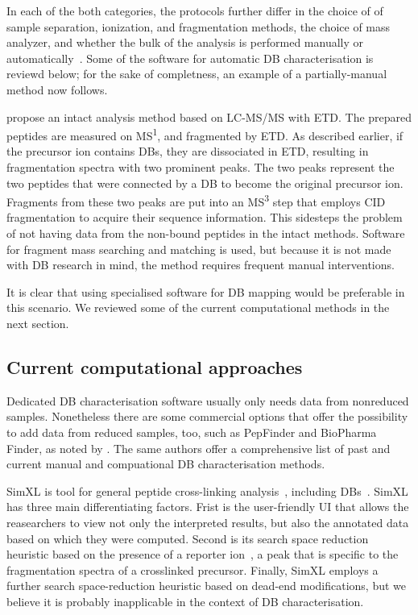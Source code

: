 In each of the both categories, the protocols further differ in the choice of of sample separation, ionization, and fragmentation methods, the choice of mass analyzer, and whether the bulk of the analysis is performed manually or automatically~\cite{lakbub2018recent}. Some of the software for automatic DB characterisation is reviewd below; for the sake of completness, an example of a partially-manual method now follows.

\citet{wu2009mass} propose an intact analysis method based on LC-MS/MS with ETD\@. The prepared peptides are measured on MS\textsuperscript{1}, and fragmented by ETD\@. As described earlier, if the precursor ion contains DBs, they are dissociated in ETD, resulting in fragmentation spectra with two prominent peaks. The two peaks represent the two peptides that were connected by a DB to become the original precursor ion. Fragments from these two peaks are put into an MS\textsuperscript{3} step that employs CID fragmentation to acquire their sequence information. This sidesteps the problem of not having data from the non-bound peptides in the intact methods. Software for fragment mass searching and matching is used, but because it is not made with DB research in mind, the method requires frequent manual interventions.

It is clear that using specialised software for DB mapping would be preferable in this scenario. We reviewed some of the current computational methods in the next section.

\subsection{Current computational approaches}

Dedicated DB characterisation software usually only needs data from nonreduced samples. Nonetheless there are some commercial options that offer the possibility to add data from reduced samples, too, such as PepFinder and BioPharma Finder, as noted by \citet{lakbub2018recent}. The same authors offer a comprehensive list of past and current manual and compuational DB characterisation methods.

SimXL is tool for general peptide cross-linking analysis~\cite{lima2015sim}, including DBs~\cite{cui2019comprehensive}. SimXL has three main differentiating factors. Frist is the user-friendly UI that allows the reasearchers to view not only the interpreted results, but also the annotated data based on which they were computed. Second is its search space reduction heuristic based on the presence of a reporter ion~\cite{iglesias2010identification}, a peak that is specific to the fragmentation spectra of a crosslinked precursor. Finally, SimXL employs a further search space-reduction heuristic based on dead-end modifications, but we believe it is probably inapplicable in the context of DB characterisation.

